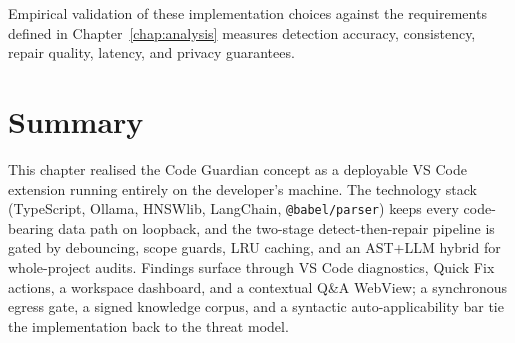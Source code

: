 Empirical validation of these implementation choices against the requirements defined in Chapter~\ref{chap:analysis} measures detection accuracy, consistency, repair quality, latency, and privacy guarantees.











\section{Summary}
\label{sec:impl-summary}

This chapter realised the Code Guardian concept as a deployable VS Code extension running entirely on the developer's machine. The technology stack (TypeScript, Ollama, HNSWlib, LangChain, \texttt{@babel/parser}) keeps every code-bearing data path on loopback, and the two-stage detect-then-repair pipeline is gated by debouncing, scope guards, LRU caching, and an AST+LLM hybrid for whole-project audits. Findings surface through VS Code diagnostics, Quick Fix actions, a workspace dashboard, and a contextual Q\&A WebView; a synchronous egress gate, a signed knowledge corpus, and a syntactic auto-applicability bar tie the implementation back to the threat model.

